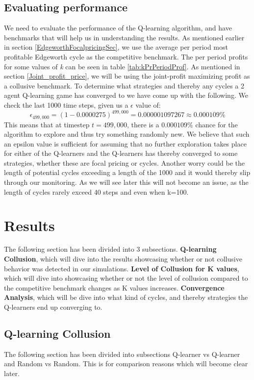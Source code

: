 \documentclass{article}
\begin{document}
\subsection{Evaluating performance}
We need to evaluate the performance of the Q-learning algorithm, and have benchmarks that will help us in understanding the results. 
As mentioned earlier in section \ref{EdgeworthFocalpricingSec}, we use the average per period most profitable Edgeworth cycle as the competitive benchmark. The per period profits for some values of \textit{k} can be seen in table \ref{tab:kPrPeriodProf}. As mentioned in section \ref{Joint_profit_price}, we will be using the joint-profit maximizing profit as a collusive benchmark. 
\newline
To determine what strategies and thereby any cycles a 2 agent Q-learning game has converged to we have come up with the following. We check the last 1000 time steps, given us a  $\epsilon$ value of:
\begin{equation}
    \epsilon_{499,000}= (1-0.0000275)^{499,000}=0.000001097267\approx 0.000109\%
\end{equation} 
This means that at timestep $t = 499,000$, there is a $0.000109\%$ chance for the algorithm to explore and thus try something randomly new. 
We believe that such an epsilon value is sufficient for assuming that no further exploration takes place for either of the Q-learners and the Q-learners has thereby converged to some strategies, whether these are focal pricing or cycles. Another worry could be the length of potential cycles exceeding a length of the 1000 and it would thereby slip through our monitoring. As we will see later this will not become an issue, as the length of cycles rarely exceed 40 steps and even when k=100. 

\section{Results}
\label{Results section}
The following section has been divided into 3 subsections. \textbf{Q-learning Collusion}, which will dive into the results showcasing whether or not collusive behavior was detected in our simulations. \textbf{Level of Collusion for K values}, which will dive into showcasing whether or not the level of collusion compared to the competitive benchmark changes as K values increases. \textbf{Convergence Analysis}, which will be dive into what kind of cycles, and thereby strategies the Q-learners end up converging to. 
\subsection{Q-learning Collusion}
\label{Q-learning Collusion}
The following section has been divided into subsections Q-learner vs Q-learner and Random vs Random. This is for comparison reasons which will become clear later. 
\end{document}
